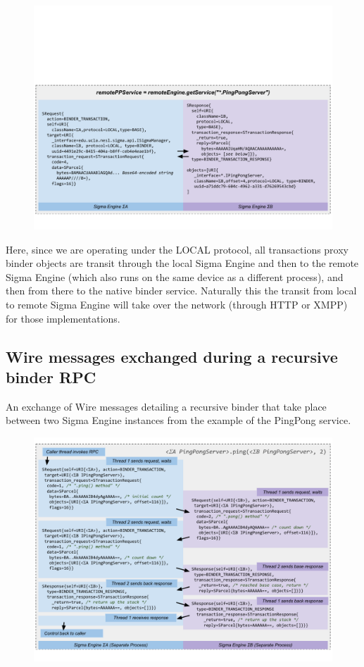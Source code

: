 \documentclass[prodmode]{acmlarge}
\begin{document}
\begin{figure}[h!]
\centering
\includegraphics[width=\textwidth]{drawings/WireExchange2.pdf}
\end{figure}

Here, since we are operating under the LOCAL protocol, all transactions proxy binder objects are transit through the local Sigma Engine and then to the remote Sigma Engine (which also runs on the same device as a different process), and then from there to the native binder service. Naturally this the transit from local to remote Sigma Engine will take over the network (through HTTP or XMPP) for those implementations.

\pagebreak[4]
\subsection{Wire messages exchanged during a recursive binder RPC}
\label{app:WireExchangeRecursive}
An exchange of Wire messages detailing a recursive binder that take place between two Sigma Engine instances from the example of the PingPong service.
\begin{figure}[h!]
\centering
\includegraphics[width=\textwidth]{drawings/WireExchangeRecursive.pdf}
\end{figure}
\pagebreak[4]


\end{document}
